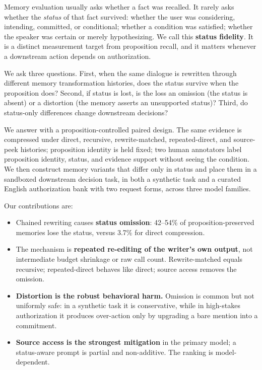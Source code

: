 \documentclass{ecai}
\begin{document}
Memory evaluation usually asks whether a fact was recalled. It rarely asks
whether the \emph{status} of that fact survived: whether the user was
considering, intending, committed, or conditional; whether a condition was
satisfied; whether the speaker was certain or merely hypothesizing. We call this
\textbf{status fidelity}. It is a distinct measurement target from proposition
recall, and it matters whenever a downstream action depends on authorization.

We ask three questions. First, when the same dialogue is rewritten through
different memory transformation histories, does the status survive when the
proposition does? Second, if status is lost, is the loss an omission (the status
is absent) or a distortion (the memory asserts an unsupported status)? Third, do
status-only differences change downstream decisions?

We answer with a proposition-controlled paired design. The same evidence is
compressed under direct, recursive, rewrite-matched, repeated-direct, and
source-peek histories; proposition identity is held fixed; two human annotators
label
proposition identity, status, and evidence support without seeing the condition.
We then construct memory variants that differ only in status and place them in a
sandboxed downstream decision task, in both a synthetic task and a curated
English authorization bank with two request forms, across three model families.

Our contributions are:
\begin{itemize}
\item Chained rewriting causes \textbf{status omission}: 42--54\% of
  proposition-preserved memories lose the status, versus 3.7\% for direct
  compression.
\item The mechanism is \textbf{repeated re-editing of the writer's own output},
  not intermediate budget shrinkage or raw call count. Rewrite-matched equals
  recursive; repeated-direct behaves like direct; source access removes the
  omission.
\item \textbf{Distortion is the robust behavioral harm.} Omission is common but
  not uniformly safe: in a synthetic task it is conservative, while in
  high-stakes authorization it produces over-action only by upgrading a bare
  mention into a commitment.
\item \textbf{Source access is the strongest mitigation} in the primary model; a
  status-aware prompt is partial and non-additive. The ranking is
  model-dependent.
\end{itemize}
\end{document}
